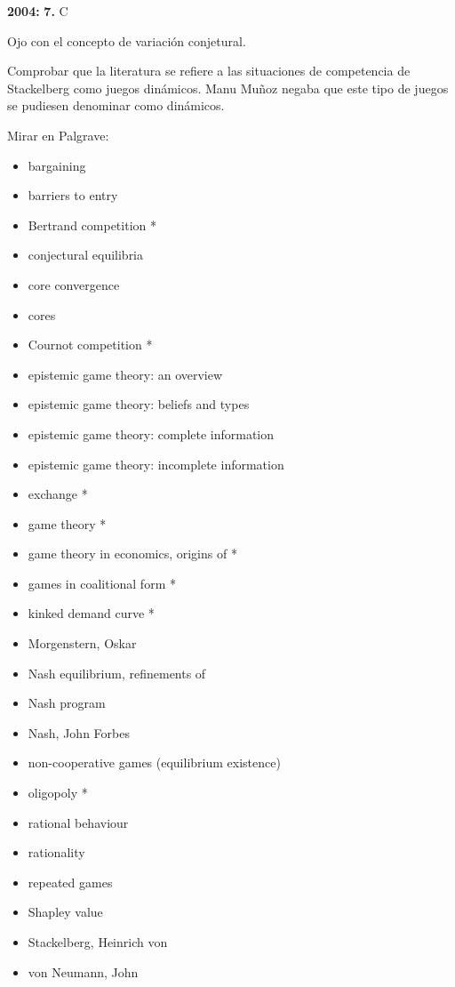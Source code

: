 \documentclass{nuevotema}
\begin{document}
\textbf{2004:} \textbf{7.} C

Ojo con el concepto de variación conjetural. 

Comprobar que la literatura se refiere a las situaciones de competencia de Stackelberg como juegos dinámicos. Manu Muñoz negaba que este tipo de juegos se pudiesen denominar como dinámicos.

\bibliografia

Mirar en Palgrave:
\begin{itemize}
	\item bargaining
	\item barriers to entry
    \item Bertrand competition *
    \item conjectural equilibria
    \item core convergence
    \item cores
    \item Cournot competition *
	\item epistemic game theory: an overview
	\item epistemic game theory: beliefs and types
	\item epistemic game theory: complete information
	\item epistemic game theory: incomplete information
    \item exchange *
    \item game theory * 
    \item game theory in economics, origins of *
    \item games in coalitional form * 
    \item kinked demand curve *
    \item Morgenstern, Oskar
	\item Nash equilibrium, refinements of
	\item Nash program
    \item Nash, John Forbes
    \item non-cooperative games (equilibrium existence)
    \item oligopoly *
    \item rational behaviour
    \item rationality
    \item repeated games
    \item Shapley value
    \item Stackelberg, Heinrich von
    \item von Neumann, John
\end{itemize}
\end{document}
